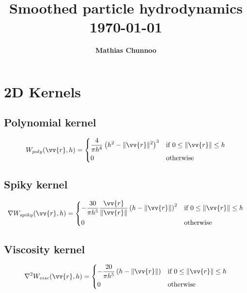 \documentclass[11pt,norsk,a4paper]{article}
\title{
    \vspace{2in}
    \textmd{\textbf{Smoothed particle hydrodynamics}}\\
    \normalsize\vspace{0.1in}\small{\today}\\
    \vspace{3in}
}
\author{\textbf{Mathias Chunnoo}}
\date{}
\begin{document}
\maketitle

\newpage
\section{2D Kernels}

\subsection{Polynomial kernel}

\begin{equation}
    W_{poly}(\vv{r}, h) = 
    \begin{dcases}
        \frac{4}{\pi h^8}
        \left( h^2 - \lVert \vv{r} \rVert^2 \right)^3
        &\text{if } 0 \le \lVert \vv{r} \rVert \le h\\
        0 &\text{otherwise}
    \end{dcases}
\end{equation}

\subsection{Spiky kernel}

\begin{equation}
    \nabla W_{spiky}(\vv{r}, h) = 
    \begin{dcases}
        -\frac{30}{\pi h^5}
        \frac{\vv{r}}{\lVert \vv{r} \rVert}
        \left( h - \lVert \vv{r} \rVert \right)^2
        &\text{if } 0 \le \lVert \vv{r} \rVert \le h\\
        0 &\text{otherwise}
    \end{dcases}
\end{equation}

\subsection{Viscosity kernel}

\begin{equation}
    \nabla^2 W_{visc}(\vv{r}, h) = 
    \begin{dcases}
        -\frac{20}{\pi h^5}
        \left( h - \lVert \vv{r} \rVert \right)
        &\text{if } 0 \le \lVert \vv{r} \rVert \le h\\
        0 &\text{otherwise}
    \end{dcases}
\end{equation}
\end{document}
